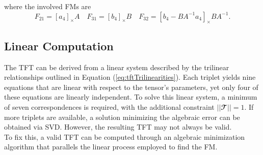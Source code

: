 where the involved \acs{FM}s are
\begin{equation}
	F_{21} = [a_4]_{\times}A \quad F_{31} = [b_4]_{\times}B \quad F_{32} = [b_4 - BA^{-1}a_4]_{\times}BA^{-1}.
\end{equation}

\subsection{Linear Computation}
The \acs{TFT} can be derived from a linear system described by the trilinear relationships outlined in Equation (\ref{eq:tftTrilinearities}). Each triplet yields nine equations that are linear with respect to the tensor's parameters, yet only four of these equations are linearly independent. To solve this linear system, a minimum of seven correspondences is required, with the additional constraint \( || \mathbfcal{T} || = 1 \). If more triplets are available, a solution minimizing the algebraic error can be obtained via \acs{SVD}. However, the resulting \acs{TFT} may not always be valid.\\

To fix this, a valid \acs{TFT} can be computed through an algebraic minimization algorithm that parallels the linear process employed to find the \acs{FM}.


